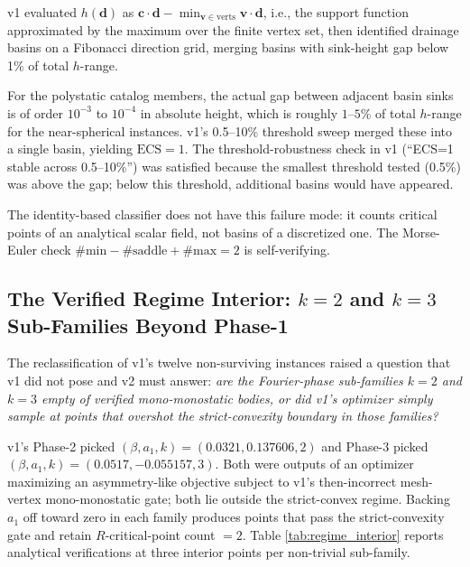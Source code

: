 \documentclass[11pt,a4paper]{article}
\begin{document}
v1 evaluated $h(\mathbf{d})$ as $\mathbf{c} \cdot \mathbf{d}
- \min_{\mathbf{v} \in \text{verts}} \mathbf{v} \cdot \mathbf{d}$,
i.e., the support function approximated by the maximum over the
finite vertex set, then identified drainage basins on a Fibonacci
direction grid, merging basins with sink-height gap below 1\% of
total $h$-range.

For the polystatic catalog members, the actual gap between adjacent
basin sinks is of order $10^{-3}$ to $10^{-4}$ in absolute height,
which is roughly $1$--$5\%$ of total $h$-range for the
near-spherical instances. v1's 0.5--10\% threshold sweep merged
these into a single basin, yielding $\mathrm{ECS} = 1$. The
threshold-robustness check in v1 (``ECS=1 stable across 0.5--10\%'')
was satisfied because the smallest threshold tested (0.5\%) was
above the gap; below this threshold, additional basins would have
appeared.

The identity-based classifier does not have this failure mode: it
counts critical points of an analytical scalar field, not basins of
a discretized one. The Morse-Euler check
$\#\text{min}-\#\text{saddle}+\#\text{max}=2$ is self-verifying.

\subsection{The Verified Regime Interior: $k=2$ and $k=3$
Sub-Families Beyond Phase-1}
\label{sec:regime_interior}

The reclassification of v1's twelve non-surviving instances raised
a question that v1 did not pose and v2 must answer: \emph{are the
Fourier-phase sub-families $k=2$ and $k=3$ empty of verified
mono-monostatic bodies, or did v1's optimizer simply sample at
points that overshot the strict-convexity boundary in those families?}

v1's Phase-2 picked $(\beta, a_1, k) = (0.0321, 0.137606, 2)$ and
Phase-3 picked $(\beta, a_1, k) = (0.0517, -0.055157, 3)$. Both
were outputs of an optimizer maximizing an asymmetry-like objective
subject to v1's then-incorrect mesh-vertex mono-monostatic gate;
both lie outside the strict-convex regime. Backing $a_1$ off toward
zero in each family produces points that pass the strict-convexity
gate and retain $R$-critical-point count $= 2$. Table
\ref{tab:regime_interior} reports analytical verifications at three
interior points per non-trivial sub-family.
\end{document}
